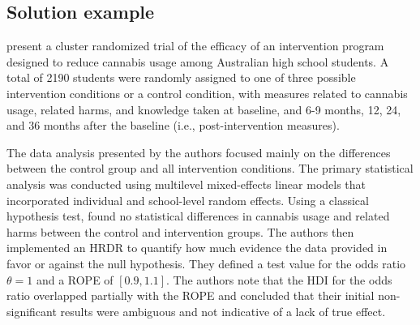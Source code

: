 \documentclass[9pt,twocolumn,twoside]{cidlab-draft}\templatetype{cidlab-invited}
\newcommand{\hdr}{HRDR}
\begin{document}
\subsection*{Solution example}

 present a cluster randomized trial of the efficacy of an intervention program designed to reduce cannabis usage among Australian high school students. A total of 2190 students were randomly assigned to one of three possible intervention conditions or a control condition, with measures related to cannabis usage, related harms, and knowledge taken at baseline, and 6-9 months, 12, 24, and 36 months after the baseline (i.e., post-intervention measures).  

The data analysis presented by the authors focused mainly on the differences between the control group and all intervention conditions. The primary statistical analysis was conducted using multilevel mixed-effects linear models that incorporated individual and school-level random effects. 
%
Using a classical hypothesis test, \citeauthor{newton2018} found no statistical differences in cannabis usage and related harms between the control and intervention groups. 
%
The authors then implemented an \hdr{} to quantify how much evidence the data provided in favor or against the null hypothesis. %
They defined a test value for the odds ratio $\theta=1$ and a ROPE of $[0.9,1.1]$. The authors note that the HDI for the odds ratio overlapped partially with the ROPE and concluded that their initial non-significant results were ambiguous and not indicative of a lack of true effect.
\end{document}
